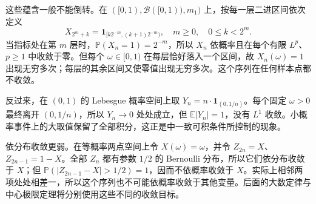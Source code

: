 这些蕴含一般不能倒转。在 \(([0,1),\mathcal B([0,1)),m_1)\) 上，按每一层二进区间依次定义
\[
 X_{2^m+k}=\mathbf1_{[k2^{-m},(k+1)2^{-m})},
 \quad m\geq0,\quad 0\leq k<2^m.
\]
当指标处在第 \(m\) 层时，\(\mathbb P(X_n=1)=2^{-m}\)，所以 \(X_n\) 依概率且在每个有限 \(L^p\)、\(p\geq1\) 中收敛于零。但每个 \(\omega\in[0,1)\) 在每层恰好落入一个区间，故 \(X_n(\omega)=1\) 出现无穷多次；每层的其余区间又使零值出现无穷多次。这个序列在任何样本点都不收敛。

\ProseParagraphBreak

反过来，在 \((0,1)\) 的 Lebesgue 概率空间上取 \(Y_n=n\cdot\mathbf1_{(0,1/n)}\)。每个固定 \(\omega>0\) 最终离开 \((0,1/n)\)，所以 \(Y_n\to0\) 处处成立，但 \(\mathbb E|Y_n|=1\)，没有 \(L^1\) 收敛。小概率事件上的大取值保留了全部积分，这正是中一致可积条件所控制的现象。

\ProseParagraphBreak

依分布收敛更弱。在等概率两点空间上令 \(X(\omega)=\omega\)，并令 \(Z_{2n}=X\)、\(Z_{2n-1}=1-X\)。全部 \(Z_n\) 都有参数 \(1/2\) 的 Bernoulli 分布，所以它们依分布收敛于 \(X\)；但 \(\mathbb P(|Z_{2n-1}-X|>1/2)=1\)，因而不依概率收敛于 \(X\)。实际上相邻两项处处相差一，所以这个序列也不可能依概率收敛于其他变量。后面的大数定律与中心极限定理将分别使用这些不同的收敛目标。
